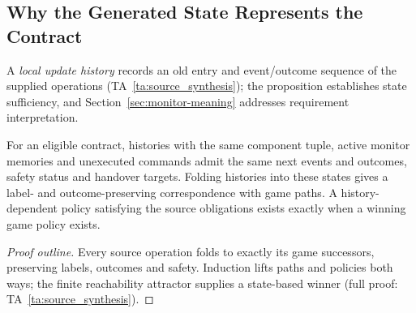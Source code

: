 \subsection{Why the Generated State Represents the Contract}
\label{sec:contract-adequacy}
A \emph{local update history} records an old entry and event/outcome sequence of the supplied operations (TA~\ref{ta:source_synthesis}); the proposition establishes state sufficiency, and Section~\ref{sec:monitor-meaning} addresses requirement interpretation.

\begin{proposition}
\label{prop:contract-adequacy}
For an eligible contract, histories with the same component tuple, active monitor memories and unexecuted commands admit the same next events and outcomes, safety status and handover targets. Folding histories into these states gives a label- and outcome-preserving correspondence with game paths. A history-dependent policy satisfying the source obligations exists exactly when a winning game policy exists.
\end{proposition}
\begin{proof}[Proof outline]
Every source operation folds to exactly its game successors, preserving labels, outcomes and safety. Induction lifts paths and policies both ways; the finite reachability attractor supplies a state-based winner (full proof: TA~\ref{ta:source_synthesis}).
\end{proof}

